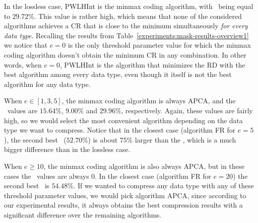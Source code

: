 In the lossless case, PWLHInt is the minmax coding algorithm, with \minmaxRD \ being equal to $29.72\%$. This value is rather high, which means that none of the considered algorithms achieves a CR that is close to the minimum simultaneously \textit{for every data type}. 
Recalling the results from Table~\ref{experiments:mask-results-overview1} we notice that $e=0$ is the only threshold parameter value for which the minmax coding algorithm doesn't obtain the minimum CR in any combination. In other words, when $e=0$, PWLHInt is the algorithm that minimizes the RD with the best algorithm among every data type, even though it itself is not the best algorithm for any data type.


When $e \in [1, 3, 5]$, the minmax coding algorithm is always APCA, and the \minmaxRD \ values are $15.64\%$, $9.00\%$ and $29.96\%$, respectively. Again, these values are fairly high, so we would select the most convenient algorithm depending on the data type we want to compress. 
Notice that in the closest case (algorithm FR for $e=5$), the second best \maxRD\ ($52.70\%$) is about $75\%$ larger than the \minmaxRD, which is a much bigger difference than in the lossless case.


When $e \geq 10$, the minmax coding algorithm is also always APCA, but in these cases the \minmaxRD \ values are always 0. In the closest case (algorithm FR for $e=20$) the second best \maxRD\ is $54.48\%$. If we wanted to compress any data type with any of these threshold parameter values, we would pick algorithm APCA, since according to our experimental results, it always obtains the best compression results with a significant difference over the remaining algorithms.

